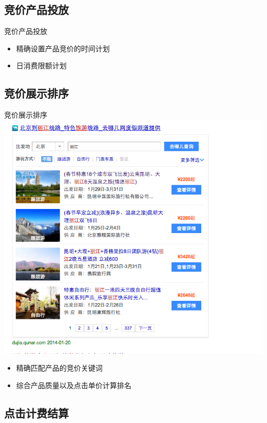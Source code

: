 \documentclass{beamer}
\begin{document}
\begin{CJK}{UTF8}{gbsn}
\subsection{竞价产品投放}
\begin{frame}{竞价产品投放}
  \begin{itemize}
  \item {
    精确设置产品竞价的时间计划
    \pause
  }
  \item {
    日消费限额计划
  }
  \end{itemize}
\end{frame}


\subsection{竞价展示排序}

\begin{frame}{竞价展示排序}
  \includegraphics[scale=0.25]{./imgs/overview-baidu}
  \begin{itemize}
  \item {
    精确匹配产品的竞价关键词
    \pause
  }
  \item {
    综合产品质量以及点击单价计算排名
  }
  \end{itemize}
\end{frame}

\subsection{点击计费结算}


\end{CJK}
\end{document}
